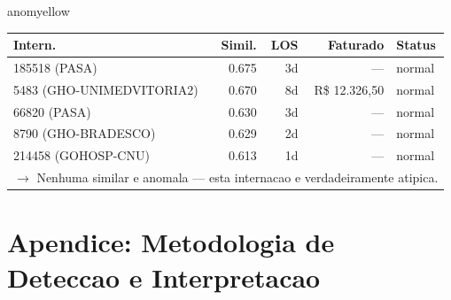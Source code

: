 \documentclass[a4paper,10pt]{article}
\begin{document}
\begin{anomalycard}[Internacao 147898 | PASA | MODERADO (z=2.01)]{anomyellow}
\begin{tabular}{l r r r l}\toprule\textbf{Intern.} & \textbf{Simil.} & \textbf{LOS} & \textbf{Faturado} & \textbf{Status} \\\midrule
185518 (PASA) & 0.675 & 3d & --- & \textcolor{jcubeblue}{normal} \\
5483 (GHO-UNIMEDVITORIA2) & 0.670 & 8d & R\$ 12.326,50 & \textcolor{jcubeblue}{normal} \\
66820 (PASA) & 0.630 & 3d & --- & \textcolor{jcubeblue}{normal} \\
8790 (GHO-BRADESCO) & 0.629 & 2d & --- & \textcolor{jcubeblue}{normal} \\
214458 (GOHOSP-CNU) & 0.613 & 1d & --- & \textcolor{jcubeblue}{normal} \\
\multicolumn{5}{l}{\textcolor{jcubeblue}{\small $\rightarrow$ Nenhuma similar e anomala --- esta internacao e verdadeiramente atipica.}} \\
\bottomrule\end{tabular}



\end{anomalycard}

\newpage

\clearpage
\section*{Apendice: Metodologia de Deteccao e Interpretacao}
\end{document}
